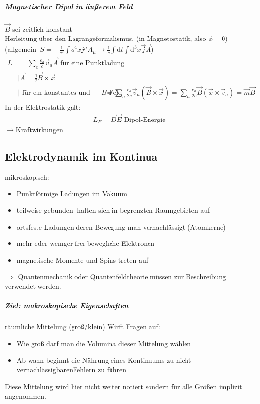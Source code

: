 \documentclass[a4paper]{article}
\begin{document}
\subparagraph{Magnetischer Dipol in äußerem Feld}
$\vec{B}$ sei zeitlich konstant\\
Herleitung über den Lagrangeformalismus. (in Magnetostatik, also $\phi=0$)\\
(allgemein: $ S=-\frac{1}{c^2}\int d^4x j^\mu A_\mu\rightarrow \frac{1}{c}\int
\mathrm{d}t \int \mathrm{d}^3x \vec{j}\vec{A}$)
\begin{align}
L&=\sum_a\frac{e_a}{c}\vec{v}_a\vec{A} \text{ für eine Punktladung}\\
&|\vec{A}=\frac{1}{2}\vec{B}\times\vec{x} \\&|\text{ für ein konstantes und
 Ortsunabhängiges }B\text{-Feld}
&=\sum_a\frac{e_a}{2c}\vec{v}_a(\vec{B}\times\vec{x})=\sum_a\frac{e_a}{2c}
\vec{B}(\vec{x}\times\vec{v}_a)=\vec{m}\vec{B}
\end{align}
In der Elektrostatik galt:
\begin{align}
L_E=\vec{D}\vec{E} \text{  Dipol-Energie}
\end{align}
$\rightarrow$Kraftwirkungen


\subsection{Elektrodynamik im Kontinua}
mikroskopisch: 
\begin{itemize}
  \item Punktförmige Ladungen im Vakuum
  \item teilweise gebunden, halten sich in  begrenzten Raumgebieten auf
  \item ortsfeste Ladungen deren Bewegung man vernachlässigt (Atomkerne)
  \item mehr oder weniger frei bewegliche Elektronen
  \item magnetische Momente und Spins treten auf
\end{itemize}
$\Rightarrow$ Quantenmechanik oder Quantenfeldtheorie müssen zur Beschreibung
verwendet werden.
\subparagraph{Ziel: makroskopische Eigenschaften}
räumliche Mittelung (groß/klein)
Wirft Fragen auf:
\begin{itemize}
  \item Wie groß darf man die Volumina dieser Mittelung wählen
  \item Ab wann beginnt die Nährung eines Kontinuums zu nicht
  vernachlässigbarenFehlern zu führen
\end{itemize}
Diese Mittelung wird hier nicht weiter notiert sondern für alle Größen implizit
angenommen.
\end{document}
